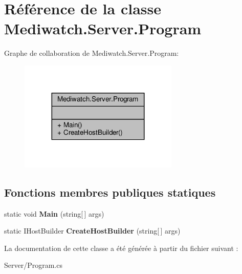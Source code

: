 \hypertarget{class_mediwatch_1_1_server_1_1_program}{}\section{Référence de la classe Mediwatch.\+Server.\+Program}
\label{class_mediwatch_1_1_server_1_1_program}


Graphe de collaboration de Mediwatch.\+Server.\+Program\+:
\nopagebreak
\begin{figure}[H]
\begin{center}
\leavevmode
\includegraphics[width=215pt]{class_mediwatch_1_1_server_1_1_program__coll__graph}
\end{center}
\end{figure}
\subsection*{Fonctions membres publiques statiques}
\begin{DoxyCompactItemize}
\item 
\mbox{\label{class_mediwatch_1_1_server_1_1_program_a0b37e08654729aa1c9f3a572e5775305}} 
static void {\bfseries Main} (string\mbox{[}$\,$\mbox{]} args)
\item 
\mbox{\label{class_mediwatch_1_1_server_1_1_program_a5278302328dd5740238221820ef8fa07}} 
static I\+Host\+Builder {\bfseries Create\+Host\+Builder} (string\mbox{[}$\,$\mbox{]} args)
\end{DoxyCompactItemize}


La documentation de cette classe a été générée à partir du fichier suivant \+:\begin{DoxyCompactItemize}
\item 
Server/Program.\+cs\end{DoxyCompactItemize}

